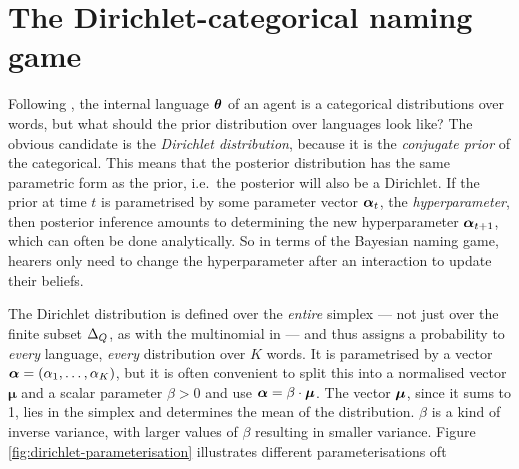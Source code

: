 \documentclass{../src/bcthesispart}
\begin{document}
\section{The Dirichlet-categorical naming game}

Following \textcite{DeVylder2006}, the internal language $\boldsymbol{\mathbf{\theta}}$ of an agent is a categorical distributions over words, but what should the prior distribution over languages look like?
The obvious candidate is the \emph{Dirichlet distribution}, because it is the \emph{conjugate prior} of the categorical.
This means that the posterior distribution has the same parametric form as the prior, i.e.~the posterior will also be a Dirichlet.
If the prior at time $t$ is parametrised by some parameter vector $\boldsymbol{\mathbf{\alpha}}_t$, the \emph{hyperparameter}, then posterior inference amounts to determining the new hyperparameter $\boldsymbol{\mathbf{\alpha}}_{t+1}$, which can often be done analytically.
So in terms of the Bayesian naming game, hearers only need to change the hyperparameter after an interaction to update their beliefs.




The Dirichlet distribution is defined over the \emph{entire} simplex — not just over the finite subset $\Delta_Q$, as with the multinomial in \textcite{DeVylder2006} — and thus assigns a probability to \emph{every} language, \emph{every} distribution over $K$ words.
It is parametrised by a vector $\boldsymbol{\mathbf{\alpha}} = (\alpha_1, \dots, \alpha_K)$, but it is often convenient to split this into a normalised vector $\mathbf\mu$ and a scalar parameter $\beta>0$ and use $\boldsymbol{\mathbf{\alpha}} = \beta\cdot\boldsymbol{\mathbf{\mu}}$.
The vector $\boldsymbol{\mathbf{\mu}}$, since it sums to 1, lies in the simplex and determines the mean of the distribution.
$\beta$ is a kind of inverse variance, with larger values of $\beta$ resulting in smaller variance.
Figure \ref{fig:dirichlet-parameterisation} illustrates different parameterisations oft 
\end{document}
